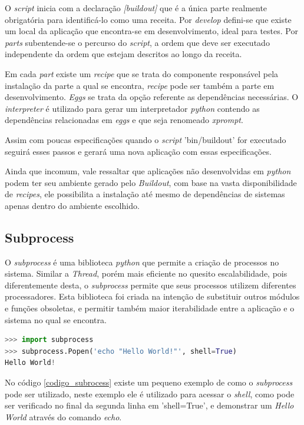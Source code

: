 O \textit{script} inicia com a declaração \textit{[buildout]} que é a única parte realmente obrigatória para identificá-lo como uma receita. Por \textit{develop} defini-se que existe um local da aplicação que encontra-se em desenvolvimento, ideal para testes. Por \textit{parts} subentende-se o percurso do \textit{script}, a ordem que deve ser executado independente da ordem que estejam descritos ao longo da receita.

Em cada \textit{part} existe um \textit{recipe} que se trata do componente responsável pela instalação da parte a qual se encontra, \textit{recipe} pode ser também a parte em desenvolvimento. \textit{Eggs} se trata da opção referente as dependências necessárias. O \textit{interpreter} é utilizado para gerar um interpretador \textit{python} contendo as dependências relacionadas em \textit{eggs} e que seja renomeado \textit{xprompt}.

Assim com poucas especificações quando o \textit{script} 'bin/buildout' for executado seguirá esses passos e gerará uma nova aplicação com essas especificações.

Ainda que incomum, vale ressaltar que aplicações não desenvolvidas em \textit{python} podem ter seu ambiente gerado pelo \textit{Buildout}, com base na vasta disponibilidade de \textit{recipes}, ele possibilita a instalação até mesmo de dependências de sistemas apenas dentro do ambiente escolhido.

\subsection{Subprocess}

O \textit{subprocess} é uma biblioteca \textit{python} que permite a criação de processos no sistema. Similar a \textit{Thread}, porém mais eficiente no quesito escalabilidade, pois diferentemente desta, o \textit{subprocess} permite que seus processos utilizem diferentes processadores. Esta biblioteca foi criada na intenção de substituir outros módulos e funções obsoletas, e permitir também maior iterabilidade entre a aplicação e o sistema no qual se encontra.

{\singlespace
\begin{lstlisting}[caption=Exemplo de uso do \textit{subprocess},language=python,label={codigo_subrocess}]
>>> import subprocess
>>> subprocess.Popen('echo "Hello World!"', shell=True)
Hello World!
\end{lstlisting}
}

No código \ref{codigo_subrocess} existe um pequeno exemplo de como o \textit{subprocess} pode ser utilizado, neste exemplo ele é utilizado para acessar o \textit{shell}, como pode ser verificado no final da segunda linha em 'shell=True', e demonstrar um \textit{Hello World} através do comando \textit{echo}.

